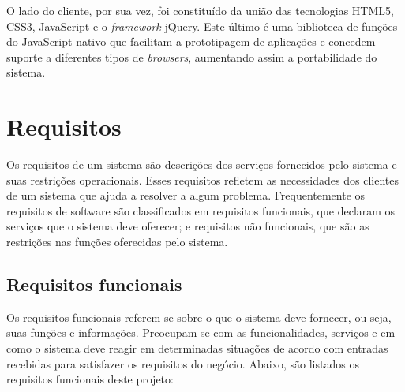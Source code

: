 O lado do cliente, por sua vez, foi constituído da união das tecnologias HTML5, CSS3, JavaScript e o \textit{framework} jQuery. Este último é uma biblioteca de funções do JavaScript nativo que facilitam a prototipagem de aplicações e concedem suporte a diferentes tipos de \textit{browsers}, aumentando assim a portabilidade do sistema.


\section{Requisitos}
\label{metodologiaRequisitos}
Os requisitos de um sistema são descrições dos serviços fornecidos pelo sistema e suas restrições operacionais. Esses requisitos refletem as necessidades dos clientes de um sistema que ajuda a resolver a algum problema. Frequentemente os requisitos de software são classificados em requisitos funcionais, que declaram os serviços que o sistema deve oferecer; e requisitos não funcionais, que são as restrições nas funções oferecidas pelo sistema. 

\subsection{Requisitos funcionais}
\label{requisitosRF}
Os requisitos funcionais referem-se sobre o que o sistema deve fornecer, ou seja, suas funções e informações. Preocupam-se com as funcionalidades, serviços e em como o sistema deve reagir em determinadas situações de acordo com entradas recebidas para satisfazer os requisitos do negócio. Abaixo, são listados os requisitos funcionais deste projeto:  

